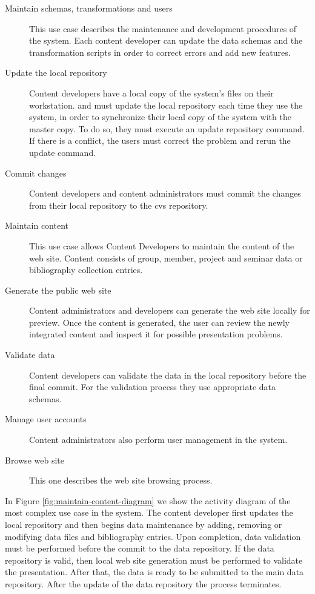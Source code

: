 \documentclass{article}
\begin{document}
\begin{description}
\item[Maintain schemas, transformations and users] This use case describes the 
maintenance and development procedures of the system. Each content developer can
update the data schemas and the transformation scripts in order to correct errors 
and add new features.

\item[Update the local repository] Content developers have a local copy of the system's files on their workstation. 
and must update the local repository each time they use the system, in order to synchronize their local copy of the system with the master copy. 
To do so, they must execute an update 
repository command. If there is a conflict, the users must correct the problem 
and rerun the update command.

\item[Commit changes] Content developers and content administrators must commit 
the changes from their local repository to the {\sc cvs} repository.

\item[Maintain content] This use case allows Content 
Developers to maintain the content of the web site. 
Content consists of group, member, project and seminar data or bibliography 
collection entries.

\item[Generate the public web site] Content administrators and developers can generate the 
web site locally for preview. Once the content is generated, 
the user can review the newly integrated content and inspect it
for possible presentation problems.

\item[Validate data] Content developers can validate the data in the local 
repository before the final commit. For the validation process
they use appropriate data schemas.

\item[Manage user accounts] Content administrators also perform user management in the 
system.

\item[Browse web site] This one describes the web site browsing process.

\end{description} 

In Figure \ref{fig:maintain-content-diagram} we show the activity diagram of the 
most complex use case in the system. The content developer first updates the 
local repository and then begins data maintenance by adding, 
removing or modifying data files and bibliography entries. Upon completion, data 
validation must be performed before the commit to the data repository. If the data 
repository is valid, then local web site generation must be performed to validate the 
presentation. After that, the data is ready to be submitted to the main 
data repository. After the update of the data repository the process terminates.
\end{document}
